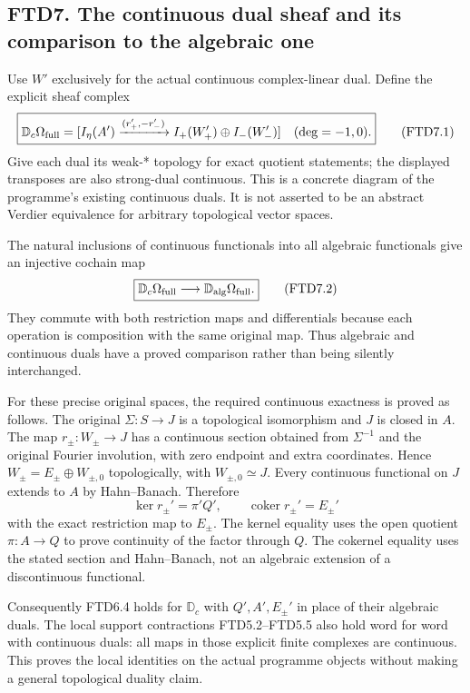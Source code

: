 \subsection{FTD7. The continuous dual sheaf and its comparison to the
algebraic
one}\label{ftd7.-the-continuous-dual-sheaf-and-its-comparison-to-the-algebraic-one}

Use \(W'\) exclusively for the actual continuous complex-linear dual.
Define the explicit sheaf complex \[
\boxed{
\mathbb D_c\Omega_{\rm full}
=[I_\eta(A')\xrightarrow{(r_+',-r_-')}
I_+(W_+')\oplus I_-(W_-')]
\quad(\deg=-1,0).}
\tag{FTD7.1}
\] Give each dual its weak-* topology for exact quotient statements; the
displayed transposes are also strong-dual continuous. This is a concrete
diagram of the programme's existing continuous duals. It is not asserted
to be an abstract Verdier equivalence for arbitrary topological vector
spaces.

The natural inclusions of continuous functionals into all algebraic
functionals give an injective cochain map \[
\boxed{\mathbb D_c\Omega_{\rm full}
\longrightarrow\mathbb D_{\rm alg}\Omega_{\rm full}.}
\tag{FTD7.2}
\] They commute with both restriction maps and differentials because
each operation is composition with the same original map. Thus algebraic
and continuous duals have a proved comparison rather than being silently
interchanged.

For these precise original spaces, the required continuous exactness is
proved as follows. The original \(\Sigma:S\to J\) is a topological
isomorphism and \(J\) is closed in \(A\). The map \(r_\pm:W_\pm\to J\)
has a continuous section obtained from \(\Sigma^{-1}\) and the original
Fourier involution, with zero endpoint and extra coordinates. Hence
\(W_\pm=E_\pm\oplus W_{\pm,0}\) topologically, with
\(W_{\pm,0}\simeq J\). Every continuous functional on \(J\) extends to
\(A\) by Hahn--Banach. Therefore \[
\ker r_\pm'=\pi'Q',\qquad
\operatorname{coker}r_\pm'=E_\pm'
\tag{FTD7.3}
\] with the exact restriction map to \(E_\pm\). The kernel equality uses
the open quotient \(\pi:A\to Q\) to prove continuity of the factor
through \(Q\). The cokernel equality uses the stated section and
Hahn--Banach, not an algebraic extension of a discontinuous functional.

Consequently FTD6.4 holds for \(\mathbb D_c\) with \(Q',A',E_\pm'\) in
place of their algebraic duals. The local support contractions
FTD5.2--FTD5.5 also hold word for word with continuous duals: all maps
in those explicit finite complexes are continuous. This proves the local
identities on the actual programme objects without making a general
topological duality claim.

